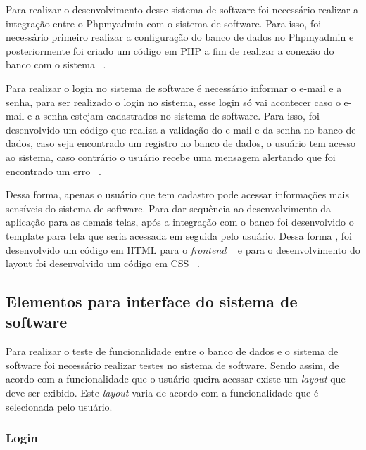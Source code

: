 Para realizar o desenvolvimento desse sistema de software foi necessário realizar a integração entre o Phpmyadmin com o sistema de software. Para isso, foi necessário primeiro realizar a configuração do banco de dados no Phpmyadmin e posteriormente foi criado um código em PHP a fim de realizar a conexão do banco com o sistema ~.

%

Para realizar o login no sistema de software é necessário informar o e-mail e a senha, para ser realizado o login no sistema, esse login só vai acontecer caso o e-mail e a senha estejam cadastrados no sistema de software. Para isso, foi desenvolvido um código que realiza a validação do e-mail e da senha no banco de dados, caso seja encontrado um registro no banco de dados, o usuário tem acesso ao sistema, caso contrário o usuário recebe uma mensagem alertando que foi encontrado um erro ~.


%

Dessa forma, apenas o usuário que tem cadastro pode acessar informações mais sensíveis do sistema de software.
Para dar sequência ao desenvolvimento da aplicação para as demais telas, após a integração com o banco foi desenvolvido o template para tela que seria acessada em seguida pelo usuário. Dessa forma , foi desenvolvido um código em \acrfull{HTML} para o \emph{frontend} ~ e para o desenvolvimento do layout foi desenvolvido um código em \acrfull{CSS} ~. 

%



\subsection{Elementos para interface do sistema de software}

Para realizar o teste de funcionalidade entre o banco de dados e o sistema de software foi necessário realizar testes no sistema de software. Sendo assim, de acordo com a funcionalidade que o usuário queira acessar existe um \emph{layout} que deve ser exibido. Este \emph{layout} varia de acordo com a funcionalidade que é selecionada pelo usuário.

\subsubsection{Login}

